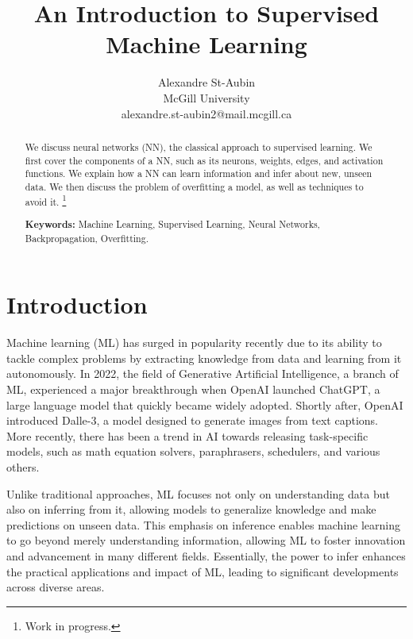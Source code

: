 \documentclass{article}
\title{An Introduction to Supervised Machine Learning}
\author{
  Alexandre St-Aubin \\
  \hspace{0.5mm} McGill University \\
  \hspace{0.5mm} alexandre.st-aubin2@mail.mcgill.ca\\
  }
\begin{document}
 
\maketitle

\begin{abstract} 

\noindent
  We discuss neural networks (NN), the classical approach to supervised learning. We first cover the components of a NN, such as its neurons, weights, edges, and activation functions. We explain how a NN can learn information and infer about new, unseen data. We then discuss the problem of overfitting a model, as well as techniques to avoid it.
  \footnote{Work in progress.}

\vspace{5mm}


\textbf{Keywords:} Machine Learning, Supervised Learning, Neural Networks, Backpropagation, Overfitting.


\textbf{}

\end{abstract} 


\vfill

\clearpage

\newpage

\tableofcontents

\newpage

\section{Introduction}
Machine learning (ML) has surged in popularity recently due to its ability to tackle complex problems by extracting knowledge from data and learning from it autonomously. In 2022, the field of Generative Artificial Intelligence, a branch of ML, experienced a major breakthrough when OpenAI launched ChatGPT, a large language model that quickly became widely adopted. Shortly after, OpenAI introduced Dalle-3, a model designed to generate images from text captions. More recently, there has been a trend in AI towards releasing task-specific models, such as math equation solvers, paraphrasers, schedulers, and various others.

Unlike traditional approaches, ML focuses not only on understanding data but also on inferring from it, allowing models to generalize knowledge and make predictions on unseen data. This emphasis on inference enables machine learning to go beyond merely understanding information, allowing ML to foster innovation and advancement in many different fields. Essentially, the power to infer enhances the practical applications and impact of ML, leading to significant developments across diverse areas.
\end{document}
